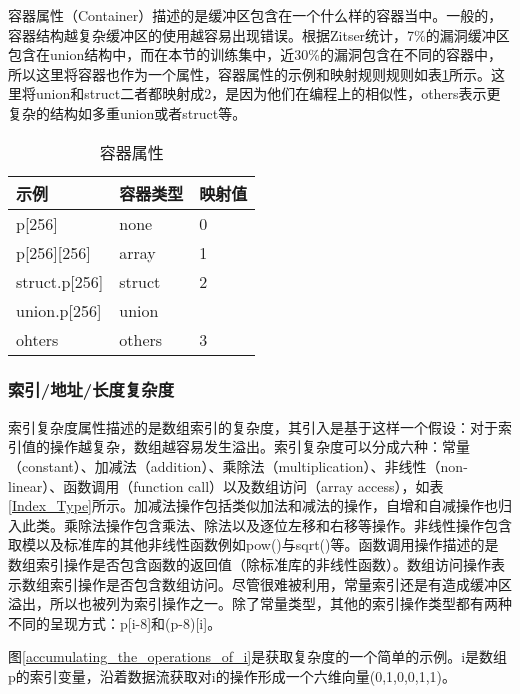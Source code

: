 {容器属性（Container）描述的是缓冲区包含在一个什么样的容器当中。一般的，容器结构越复杂缓冲区的使用越容易出现错误。根据Zitser统计，7\%的漏洞缓冲区包含在union结构中，而在本节的训练集中，近30\%的漏洞包含在不同的容器中，所以这里将容器也作为一个属性，容器属性的示例和映射规则规则如表\ref{Container_Attributes}所示。这里将union和struct二者都映射成2，是因为他们在编程上的相似性，others表示更复杂的结构如多重union或者struct等。


\begin{table}[ht]
\begin{center}
\caption{容器属性} \label{Container_Attributes}
\begin{small}
\begin{tabular}{lll}
\hline
{\bf 示例 } & {\bf 容器类型} & {\bf 映射值} \\
\hline
p[256] & none &  0\\
\hline
p[256][256] & array & 1 \\ \hline
struct.p[256] & struct & 2  \\ 
union.p[256] & union & \\ \hline
ohters & others & 3 \\ \hline
\end{tabular}
\end{small}
\end{center}
\end{table}

\subsubsection{索引/地址/长度复杂度}

索引复杂度属性描述的是数组索引的复杂度，其引入是基于这样一个假设：对于索引值的操作越复杂，数组越容易发生溢出。索引复杂度可以分成六种：常量（constant）、加减法（addition）、乘除法（multiplication）、非线性（non-linear）、函数调用（function call）以及数组访问（array access），如表\ref{Index_Type}所示。加减法操作包括类似加法和减法的操作，自增和自减操作也归入此类。乘除法操作包含乘法、除法以及逐位左移和右移等操作。非线性操作包含取模以及标准库的其他非线性函数例如pow()与sqrt()等。函数调用操作描述的是数组索引操作是否包含函数的返回值（除标准库的非线性函数）。数组访问操作表示数组索引操作是否包含数组访问。尽管很难被利用，常量索引还是有造成缓冲区溢出，所以也被列为索引操作之一。除了常量类型，其他的索引操作类型都有两种不同的呈现方式：p[i-8]和(p-8)[i]。

图\ref{accumulating_the_operations_of_i}是获取复杂度的一个简单的示例。i是数组p的索引变量，沿着数据流获取对i的操作形成一个六维向量{(0,1,0,0,1,1)}。

}
